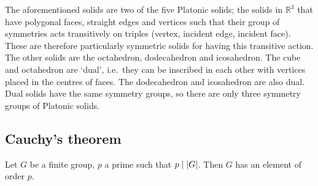 The aforementioned solids are two of the five Platonic solids; the solids in \(\mathbb R^3\) that have polygonal faces, straight edges and vertices such that their group of symmetries acts transitively on triples (vertex, incident edge, incident face).
These are therefore particularly symmetric solids for having this transitive action.
The other solids are the octahedron, dodecahedron and icosahedron.
The cube and octahedron are `dual', i.e.\ they can be inscribed in each other with vertices placed in the centres of faces.
The dodecahedron and icosahedron are also dual.
Dual solids have the same symmetry groups, so there are only three symmetry groups of Platonic solids.

\subsection{Cauchy's theorem}
\begin{theorem}
	Let \(G\) be a finite group, \(p\) a prime such that \(p \mid \abs{G}\).
	Then \(G\) has an element of order \(p\).
\end{theorem}
